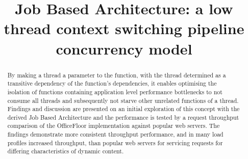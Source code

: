 \documentclass[conference]{ieee/IEEEtran}
\begin{document}
\title{Job Based Architecture: a low thread context switching pipeline
concurrency model}


\author{
}


% 








\maketitle


\begin{abstract}
By making a thread a parameter to the function, with the thread determined as a
transitive dependency of the function's dependencies, it enables
optimising the isolation of functions containing application level performance
bottlenecks to not consume all threads and subsequently not starve other unrelated functions of a thread.
Findings and discussion are presented on an initial exploration of this concept
with the derived Job Based Architecture and the performance is tested by a
request throughput comparison of the OfficeFloor implementation against
popular web servers.  The findings demonstrate more consistent throughput
performance, and in many load profiles increased throughput, than
popular web servers for servicing requests for differing
characteristics of dynamic content.
\end{abstract}
\end{document}
